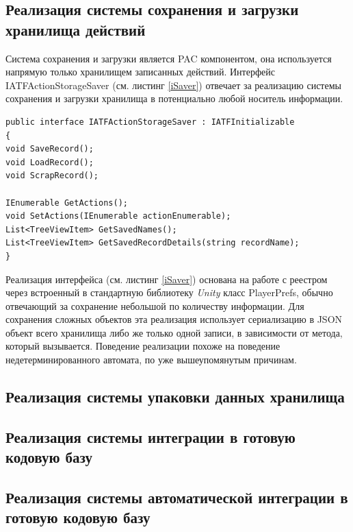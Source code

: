 \subsection{Реализация системы сохранения и загрузки хранилища действий}
Система сохранения и загрузки является PAC компонентом, она используется напрямую только хранилищем записанных действий. Интерфейс IATFActionStorageSaver (см. листинг \ref{iSaver}) отвечает за реализацию системы сохранения и загрузки хранилища в потенциально любой носитель информации.

\begin{lstlisting}[caption={Интерфейс модуля загрузчика хранилища записей},label=iSaver]
public interface IATFActionStorageSaver : IATFInitializable
{
void SaveRecord();
void LoadRecord();
void ScrapRecord();

IEnumerable GetActions();
void SetActions(IEnumerable actionEnumerable);
List<TreeViewItem> GetSavedNames();
List<TreeViewItem> GetSavedRecordDetails(string recordName);
}
\end{lstlisting}

Реализация интерфейса (см. листинг \ref{iSaver}) основана на работе с реестром через встроенный в стандартную библиотеку \textit{Unity} класс PlayerPrefs, обычно отвечающий за сохранение небольшой по количеству информации. Для сохранения сложных объектов эта реализация использует сериализацию в JSON объект всего хранилища либо же только одной записи, в зависимости от метода, который вызывается. Поведение реализации похоже на поведение недетерминированного автомата, по уже вышеупомянутым причинам.

\subsection{Реализация системы упаковки данных хранилища}

\subsection{Реализация системы интеграции в готовую кодовую базу}

\subsection{Реализация системы автоматической интеграции в готовую кодовую базу}
